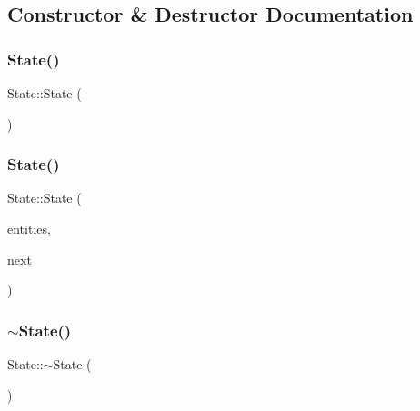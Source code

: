 \subsection{Constructor \& Destructor Documentation}
\mbox{\label{class_state_ab91bb1dd5aa6260ab2a456581daf9ec2}} 
\subsubsection{\texorpdfstring{State()}{State()}\hspace{0.1cm}{\footnotesize\ttfamily [1/2]}}
{\footnotesize\ttfamily State\+::\+State (\begin{DoxyParamCaption}{ }\end{DoxyParamCaption})}

\mbox{\label{class_state_a79094488d03d0299758e83eda0ae3372}} 
\subsubsection{\texorpdfstring{State()}{State()}\hspace{0.1cm}{\footnotesize\ttfamily [2/2]}}
{\footnotesize\ttfamily State\+::\+State (\begin{DoxyParamCaption}\item[{std\+::vector$<$ \mbox{\hyperlink{class_entity}{Entity}} $\ast$$>$ $\ast$}]{entities,  }\item[{std\+::vector$<$ \mbox{\hyperlink{_finite_state_machine_8h_af5cd382b45a5ef41d63b95e55fbeca95}{E\+State}} $>$ $\ast$}]{next }\end{DoxyParamCaption})}

\mbox{\label{class_state_afab438d92b90dc18d194dbd9c9c8bab3}} 
\subsubsection{\texorpdfstring{$\sim$\+State()}{~State()}}
{\footnotesize\ttfamily State\+::$\sim$\+State (\begin{DoxyParamCaption}{ }\end{DoxyParamCaption})}



